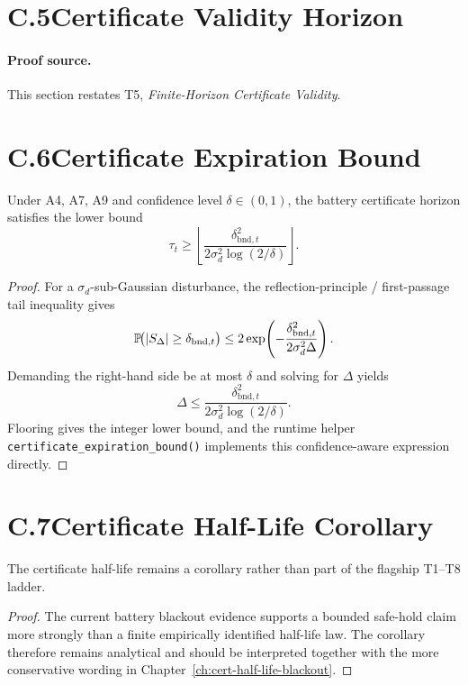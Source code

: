 \section{C.5\quad Certificate Validity Horizon}\label{sec:proof-cert-valid}
\paragraph{Proof source.} This section restates T5,
\emph{Finite-Horizon Certificate Validity}.


\section{C.6\quad Certificate Expiration Bound}\label{sec:proof-expiration}
\begin{theorem}[restated]
Under A4, A7, A9 and confidence level $\delta\in(0,1)$, the battery
certificate horizon satisfies the lower bound
\[
  \tau_t \ge
  \left\lfloor
    \frac{\delta_{\mathrm{bnd},t}^2}
    {2\sigma_d^2 \log(2/\delta)}
  \right\rfloor.
\]
\end{theorem}
\begin{proof}
For a $\sigma_d$-sub-Gaussian disturbance, the reflection-principle /
first-passage tail inequality gives
\[
  \operatorname{\mathbb{P}}\!\bigl(|S_\Delta| \ge \delta_{\mathrm{bnd},t}\bigr)
  \le
  2\exp\!\left(
    -\frac{\delta_{\mathrm{bnd},t}^2}{2\sigma_d^2\Delta}
  \right).
\]
Demanding the right-hand side be at most $\delta$ and solving for $\Delta$
yields
\[
  \Delta \le
  \frac{\delta_{\mathrm{bnd},t}^2}
       {2\sigma_d^2 \log(2/\delta)}.
\]
Flooring gives the integer lower bound, and the runtime helper
\texttt{certificate\_expiration\_bound()} implements this confidence-aware
expression directly.
\qedhere
\end{proof}

\section{C.7\quad Certificate Half-Life Corollary}\label{sec:proof-halflife}
\begin{corollary}[restated]
The certificate half-life remains a corollary rather than part of the
flagship T1--T8 ladder.
\end{corollary}
\begin{proof}
The current battery blackout evidence supports a bounded safe-hold claim more
strongly than a finite empirically identified half-life law.  The corollary
therefore remains analytical and should be interpreted together with the more
conservative wording in Chapter~\ref{ch:cert-half-life-blackout}.  \qedhere
\end{proof}

